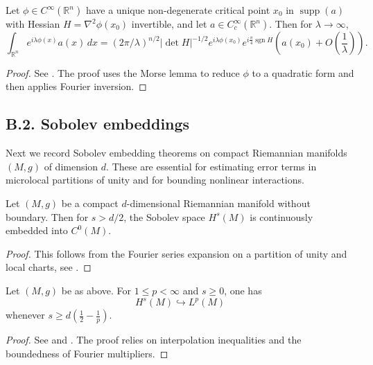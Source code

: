 \begin{lemma}
\label{lem:stationary-phase-multi}
Let $\phi \in C^\infty(\mathbb{R}^n)$ have a unique non-degenerate critical point $x_0$ in $\operatorname{supp}(a)$ with Hessian $H = \nabla^2 \phi(x_0)$ invertible, and let $a \in C_c^\infty(\mathbb{R}^n)$. Then for $\lambda \to \infty$,
\[
\int_{\mathbb{R}^n} e^{i \lambda \phi(x)} a(x)\, dx
= (2\pi/\lambda)^{n/2} |\det H|^{-1/2} e^{i \lambda \phi(x_0)} e^{i \frac{\pi}{4} \operatorname{sgn} H}
\left( a(x_0) + O\left(\frac{1}{\lambda}\right) \right).
\]
\end{lemma}

\begin{proof}
See \cite[Chapter~VIII]{HormanderI}. The proof uses the Morse lemma to reduce $\phi$ to a quadratic form and then applies Fourier inversion.
\end{proof}

\medskip

\subsection*{B.2. Sobolev embeddings}
\label{appB:sobolev-embeddings}

Next we record Sobolev embedding theorems on compact Riemannian manifolds $(M,g)$ of dimension $d$. These are essential for estimating error terms in microlocal partitions of unity and for bounding nonlinear interactions.

\begin{lemma}
\label{lem:sobolev-classical}
Let $(M,g)$ be a compact $d$-dimensional Riemannian manifold without boundary. Then for $s > d/2$, the Sobolev space $H^s(M)$ is continuously embedded into $C^0(M)$.
\end{lemma}

\begin{proof}
This follows from the Fourier series expansion on a partition of unity and local charts, see \cite[Theorem~2.4.1]{Sogge}.
\end{proof}

\begin{lemma}
\label{lem:sobolev-lp}
Let $(M,g)$ be as above. For $1 \leq p < \infty$ and $s \geq 0$, one has
\[
H^s(M) \hookrightarrow L^p(M)
\]
whenever $s \geq d\left(\tfrac{1}{2} - \tfrac{1}{p}\right)$.
\end{lemma}

\begin{proof}
See \cite[Section~5.6]{EvansPDE} and \cite[Theorem~2.4.2]{Sogge}. The proof relies on interpolation inequalities and the boundedness of Fourier multipliers.
\end{proof}

